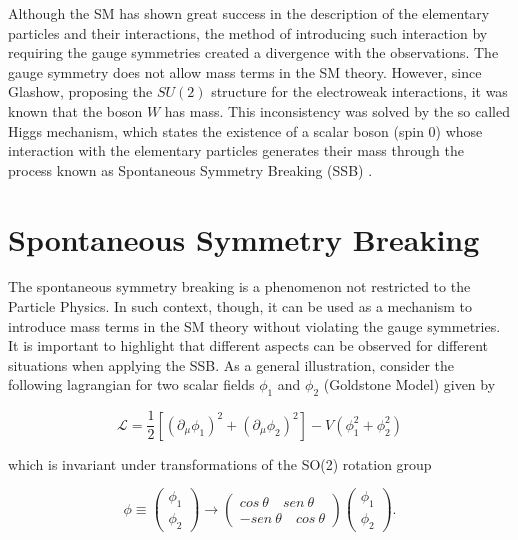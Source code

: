 Although the SM has shown great success in the description of the elementary particles and their interactions, the method of introducing such interaction by requiring the gauge symmetries created a divergence with the observations. The gauge symmetry does not allow mass terms in the SM theory. However, since Glashow, proposing the $SU(2)$ structure for the electroweak interactions, it was known that the boson $W$ has mass. This inconsistency was solved by the so called Higgs mechanism, which states the existence of a scalar boson (spin 0) whose interaction with the elementary particles generates their mass through the process known as Spontaneous Symmetry Breaking (SSB) \cite{bib:whitbeck-2013,bib:griffiths-2008}.

\section{Spontaneous Symmetry Breaking}
The spontaneous symmetry breaking is a phenomenon not restricted to the Particle Physics. In such context, though, it can be used as a mechanism to introduce mass terms in the SM theory without violating the gauge symmetries. It is important to highlight that different aspects can be observed for different situations when applying the SSB. As a general illustration, consider the following lagrangian for two scalar fields $\phi_1$ and $\phi_2$ (Goldstone Model) given by

\begin{equation}
\mathcal{L} = \dfrac{1}{2}[(\partial_{\mu}\phi_1)^2 + (\partial_{\mu}\phi_2)^2 ] - V(\phi_1^2 + \phi_2^2)
\label{eq:Goldstone_potential}
\end{equation}  

which is invariant under transformations of the SO(2) rotation group

\begin{equation}
\phi \equiv \left(\begin{aligned} \phi_1 \\ \phi_2 \end{aligned} \right) \rightarrow \left(\begin{aligned} cos \!\ \theta \quad sen \!\ \theta \\ -sen \!\ \theta \quad cos \!\ \theta \end{aligned} \right) \left(\begin{aligned} \phi_1 \\ \phi_2 \end{aligned} \right). 
\end{equation}


